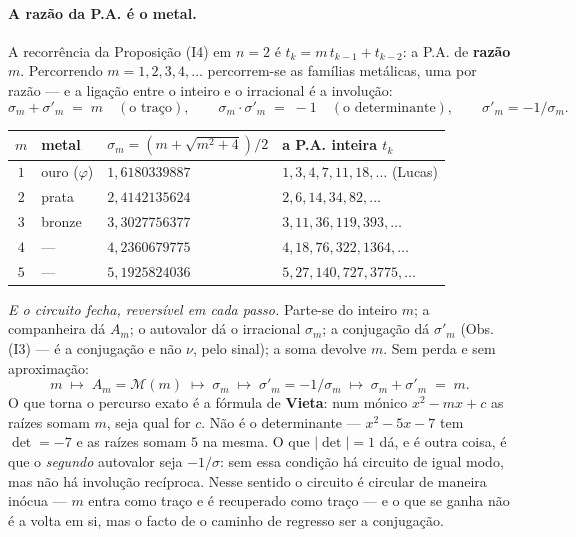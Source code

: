 \documentclass[11pt,a4paper]{article}
\theoremstyle{plain}
\theoremstyle{definition}
\theoremstyle{remark}
\newcommand{\Mat}[1]{\mathcal{M}(#1)}
\begin{document}
\paragraph{A razão da P.A. é o metal.} A recorrência da Proposição (I4) em $n=2$ é
$t_k = m\,t_{k-1} + t_{k-2}$: a P.A. de \textbf{razão $m$}. Percorrendo $m = 1,2,3,4,\dots$
percorrem-se as famílias metálicas, uma por razão --- e a ligação entre o inteiro e o irracional é
a involução:
\[
  \sigma_m + \sigma'_m \;=\; m \quad(\text{o traço}), \qquad
  \sigma_m \cdot \sigma'_m \;=\; -1 \quad(\text{o determinante}),
  \qquad \sigma'_m = -1/\sigma_m .
\]

\begin{center}\small
\begin{tabular}{clll}
\hline
$m$ & metal & $\sigma_m = (m+\sqrt{m^2+4})/2$ & a P.A. inteira $t_k$ \\ \hline
$1$ & ouro ($\varphi$) & $1{,}6180339887$ & $1,3,4,7,11,18,\dots$ (Lucas) \\
$2$ & prata & $2{,}4142135624$ & $2,6,14,34,82,\dots$ \\
$3$ & bronze & $3{,}3027756377$ & $3,11,36,119,393,\dots$ \\
$4$ & --- & $4{,}2360679775$ & $4,18,76,322,1364,\dots$ \\
$5$ & --- & $5{,}1925824036$ & $5,27,140,727,3775,\dots$ \\
\hline
\end{tabular}
\end{center}

\noindent \emph{E o circuito fecha, reversível em cada passo.} Parte-se do inteiro $m$; a
companheira dá $A_m$; o autovalor dá o irracional $\sigma_m$; a conjugação dá $\sigma'_m$
(Obs. (I3) --- é a conjugação e não $\nu$, pelo sinal); a soma devolve $m$. Sem perda
e sem aproximação:
\[
  m \;\longmapsto\; A_m=\Mat{m} \;\longmapsto\; \sigma_m \;\longmapsto\;
  \sigma'_m = -1/\sigma_m \;\longmapsto\; \sigma_m + \sigma'_m \;=\; m .
\]
O que torna o percurso exato é a fórmula de \textbf{Vieta}: num mónico $x^2-mx+c$ as raízes somam
$m$, seja qual for $c$. Não é o determinante --- $x^2-5x-7$ tem $\det = -7$ e as raízes somam $5$
na mesma. O que $|\det|=1$ dá, e é outra coisa, é que o \emph{segundo} autovalor seja $-1/\sigma$:
sem essa condição há circuito de igual modo, mas não há involução recíproca. Nesse sentido o
circuito é circular de maneira inócua --- $m$ entra como traço e é recuperado como traço --- e o
que se ganha não é a volta em si, mas o facto de o caminho de regresso ser a conjugação.
\end{document}
